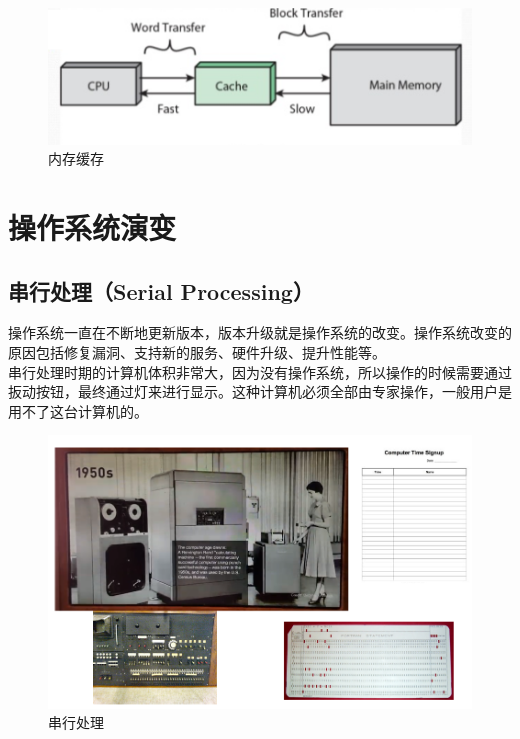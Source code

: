 \begin{figure}[H]
	\centering
	\includegraphics[scale=0.7]{img/C1/1-5/3.png}
	\caption{内存缓存}
\end{figure}

\newpage

\section{操作系统演变}

\subsection{串行处理（Serial Processing）}

操作系统一直在不断地更新版本，版本升级就是操作系统的改变。操作系统改变的原因包括修复漏洞、支持新的服务、硬件升级、提升性能等。 \\

串行处理时期的计算机体积非常大，因为没有操作系统，所以操作的时候需要通过扳动按钮，最终通过灯来进行显示。这种计算机必须全部由专家操作，一般用户是用不了这台计算机的。

\begin{figure}[H]
	\centering
	\includegraphics[scale=0.7]{img/C1/1-6/1.png}
	\caption{串行处理}
\end{figure}

